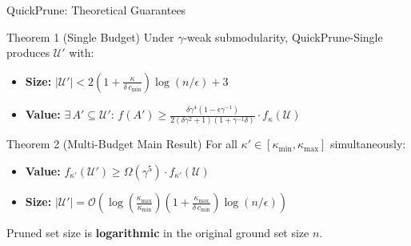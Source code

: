 \documentclass[aspectratio=169,xcolor=dvipsnames,8pt]{beamer}
\begin{document}
\begin{frame}{QuickPrune: Theoretical Guarantees}
  \begin{block}{Theorem 1 (Single Budget)}
    Under $\gamma$-weak submodularity, QuickPrune-Single produces $\mathcal{U}'$ with:
    \begin{itemize}
      \item \textbf{Size:} $|\mathcal{U}'| < 2\!\left(1 + \frac{\kappa}{\delta \,
        c_{\min}}\right)\!\log(n/\epsilon) + 3$
      \item \textbf{Value:} $\exists\, A' \subseteq \mathcal{U}'$: \;
        $f(A') \geq \frac{\delta \gamma^4(1 - \epsilon\gamma^{-1})}
        {2(\delta\gamma^2 + 1)(1 + \gamma^{-1}\delta)} \cdot f_\kappa(\mathcal{U})$
    \end{itemize}
  \end{block}

  \begin{block}{Theorem 2 (Multi-Budget Main Result)}
    For all $\kappa' \in [\kappa_{\min}, \kappa_{\max}]$ simultaneously:
    \begin{itemize}
      \item \textbf{Value:} $f_{\kappa'}(\mathcal{U}') \geq \Omega(\gamma^5) \cdot
        f_{\kappa'}(\mathcal{U})$
      \item \textbf{Size:} $|\mathcal{U}'| = \mathcal{O}\!\left(
        \log\!\left(\frac{\kappa_{\max}}{\kappa_{\min}}\right)
        \!\left(1 + \frac{\kappa_{\max}}{\delta \, c_{\min}}\right)
        \!\log(n / \epsilon)\right)$
    \end{itemize}
  \end{block}

  \vspace{0.1cm}
  \centering
  Pruned set size is \textbf{logarithmic} in the original ground set size $n$.
\end{frame}
\end{document}
